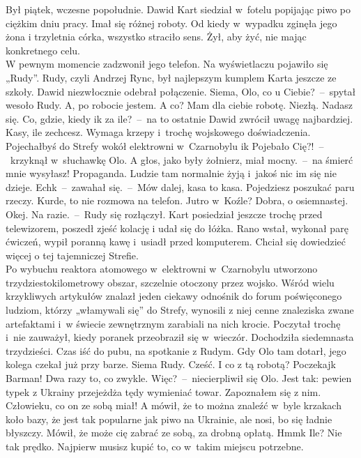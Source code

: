 \documentclass[../MAIN.tex]{subfiles}
\begin{document}
%
%
Był piątek, wczesne popołudnie. Dawid Kart siedział w~fotelu popijając piwo po
ciężkim dniu pracy. Imał się różnej roboty. Od kiedy w~wypadku zginęła jego żona
i trzyletnia córka, wszystko straciło sens. Żył, aby żyć, nie mając konkretnego
celu.\\
W pewnym momencie zadzwonił jego telefon. Na wyświetlaczu pojawiło się „Rudy”.
Rudy, czyli Andrzej Rync, był najlepszym kumplem Karta jeszcze ze szkoły. Dawid
niezwłocznie odebrał połączenie.
\sx Siema, Olo, co u Ciebie?~--~spytał wesoło Rudy.
\xx A, po robocie jestem. A co?
\xx Mam dla ciebie robotę. Niezłą. Nadasz się.
\xx Co, gdzie, kiedy i\3k za ile?~--~na to ostatnie Dawid zwrócił uwagę
najbardziej.
\xx Kasy, ile zechcesz. Wymaga krzepy i~trochę wojskowego doświadczenia.
Pojechałbyś do Strefy wokół elektrowni w~Czarnobylu i\3k
\xx Pojebało Cię?!~--~krzyknął w~słuchawkę Olo. A głos, jako były żołnierz,
miał mocny.~--~na śmierć mnie wysyłasz!
\xx Propaganda. Ludzie tam normalnie żyją i~jakoś nic im się nie dzieje.
\xx Ech\3k~--~zawahał się.~--~Mów dalej, kasa to kasa.
\xx Pojedziesz poszukać paru rzeczy. Kurde, to nie rozmowa na telefon. Jutro w~Koźle?
\xx Dobra, o osiemnastej.
\xx Okej. Na razie.~--~Rudy się rozłączył.
\qm
Kart posiedział jeszcze trochę przed telewizorem, poszedł zjeść kolację i
udał się do łóżka. Rano wstał, wykonał parę ćwiczeń, wypił poranną kawę i~usiadł
przed komputerem. Chciał się dowiedzieć więcej o tej tajemniczej Strefie.\\
Po wybuchu reaktora atomowego w~elektrowni   w~Czarnobylu utworzono
trzydziestokilometrowy obszar, szczelnie otoczony przez wojsko.
Wśród wielu krzykliwych artykułów znalazł jeden ciekawy odnośnik do forum poświęconego
ludziom, którzy „włamywali się” do Strefy, wynosili z niej cenne znaleziska
zwane artefaktami i~w świecie zewnętrznym zarabiali na nich krocie. Poczytał trochę i~nie zauważył, kiedy poranek przeobraził się w~wieczór. Dochodziła
siedemnasta trzydzieści. Czas iść do pubu, na spotkanie z Rudym. Gdy Olo tam
dotarł, jego kolega czekał już przy barze.
\sd
\xx Siema Rudy.
\xx Cześć.
\xx I co z tą robotą?
\xx Poczekaj\3k Barman! Dwa razy to, co zwykle.
\xx Więc?~--~niecierpliwił się Olo.
\xx Jest tak: pewien typek z Ukrainy przejeżdża tędy wymieniać towar. Zapoznałem
się z nim. Człowieku, co on ze sobą miał! A mówił, że to można znaleźć w~byle
krzakach koło bazy, że jest tak popularne jak piwo na Ukrainie, ale nosi, bo się
ładnie błyszczy. Mówił, że może cię zabrać ze sobą, za drobną opłatą.
\xx Hmm\3k Ile?
\xx Nie tak prędko. Najpierw musisz kupić to, co w~takim miejscu potrzebne.
\end{document}
